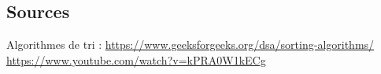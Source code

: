 \documentclass[10pt]{beamer}
\begin{document}
\begin{frame}
\section{Sources}
  Algorithmes de tri : \url{https://www.geeksforgeeks.org/dsa/sorting-algorithms/}
  \newline
  \url{https://www.youtube.com/watch?v=kPRA0W1kECg}
\end{frame}
\end{document}
